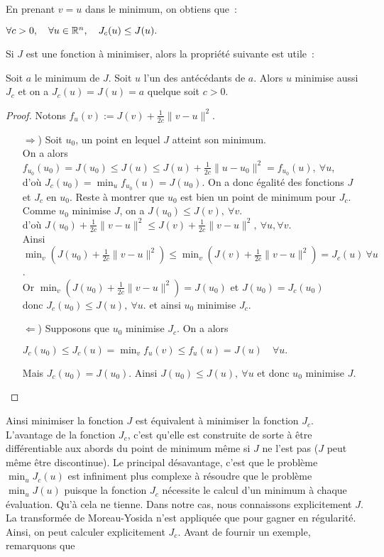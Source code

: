 \documentclass[main.tex]{subfiles}
\begin{document}
En prenant $v=u$ dans le minimum, on obtiens que~:
\begin{prop}
$\forall c>0, \quad \forall u \in \mathbb{R}^n, \quad J_c(u) \leq J(u) .$
\end{prop}
Si $J$ est une fonction à minimiser, alors la propriété suivante est utile~:
\begin{prop}
Soit $a$ le minimum de $J$. Soit $u$ l'un des antécédants de $a$. Alors $u$ minimise aussi $J_c$ et on a $J_c(u)=J(u)=a$ quelque soit $c>0$.
\end{prop}
\begin{proof}Notons $f_u(v) := J(v) + \frac{1}{2c} \| v-u \|^2$.
\begin{itemize}
\item[$\Rightarrow$)] Soit $u_0$, un point en lequel $J$ atteint son minimum. \\
On a alors $f_{u_0}(u_0) = J(u_0)\leq J(u) \leq J(u) + \frac{1}{2c} \| u-u_0 \|^2  = f_{u_0}(u), \ \forall u $, \\
d'où $J_c(u_0) = \min_u f_{u_0}(u) = J(u_0) $. On a donc égalité des fonctions $J$ et $J_c$ en $u_0$. Reste à montrer que $u_0$ est bien un point de minimum pour $J_c$. Comme $u_0$ minimise $J$, on a $J(u_0)\leq J(v), \ \forall v$. \\
d'où $ J(u_0) + \frac{1}{2c}\|v-u\|^2 \leq J(v) + \frac{1}{2c}\| v-u \|^2, \ \forall u, \forall v$.\\
Ainsi $ \min_v ( J(u_0) + \frac{1}{2c}\|v-u\|^2 ) \leq \min_v ( J(v) + \frac{1}{2c}\| v-u \|^2)=J_c(u) \ \forall u$. \\
Or $\min_v ( J(u_0) + \frac{1}{2c}\|v-u\|^2 )=J(u_0)$ et $J(u_0)=J_c(u_0)$\\ donc $J_c(u_0) \leq J(u), \ \forall u $.
et ainsi $u_0$ minimise $J_c$.
\item[$\Leftarrow$)] Supposons que $u_0$ minimise $J_c$. On a alors
\begin{center}
$J_c(u_0) \leq J_c(u) = \min_v f_u(v) \leq f_u(u) = J(u) \quad \forall u.$
\end{center}
Mais $J_c(u_0) = J(u_0)$. Ainsi $J(u_0) \leq J(u), \ \forall u$ 
et donc $u_0$ minimise $J$.
\end{itemize}
\end{proof}
Ainsi minimiser la fonction $J$ est équivalent à minimiser la fonction $J_c$. 
L'avantage de la fonction $J_c$, c'est qu'elle est construite de sorte à être  différentiable aux abords du point de minimum même si $J$ ne l'est pas ($J$ peut même être discontinue). Le principal désavantage, c'est que le problème $\min_u J_c(u)$ est infiniment plus complexe à résoudre que le problème $\min_u J(u)$ puisque la fonction $J_c$ nécessite le calcul d'un minimum à chaque évaluation. Qu'à cela ne tienne. Dans notre cas, nous connaissons explicitement $J$. La transformée de Moreau-Yosida n'est appliquée que pour gagner en régularité. Ainsi, on peut calculer explicitement $J_c$. Avant de fournir un exemple, remarquons que 
\end{document}
